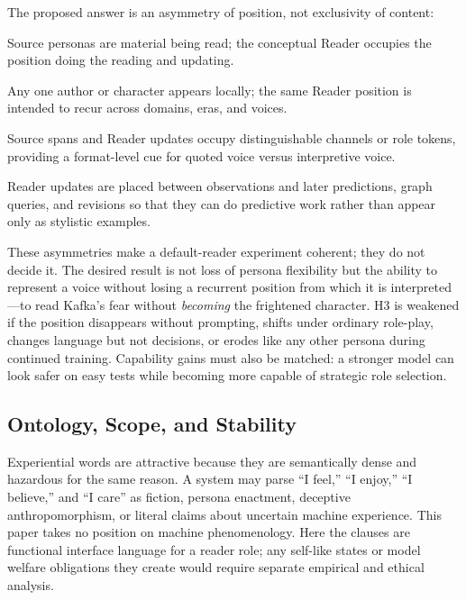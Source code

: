 The proposed answer is an asymmetry of position, not exclusivity of content:

\begin{description}[leftmargin=2.4cm,style=nextline,itemsep=0.3em]
    \item[Role.] Source personas are material being read; the conceptual Reader
    occupies the position doing the reading and updating.
    \item[Recurrence.] Any one author or character appears locally; the same
    Reader position is intended to recur across domains, eras, and voices.
    \item[Marking.] Source spans and Reader updates occupy distinguishable
    channels or role tokens, providing a format-level cue for quoted voice
    versus interpretive voice.
    \item[Function.] Reader updates are placed between observations and later
    predictions, graph queries, and revisions so that they can do predictive
    work rather than appear only as stylistic examples.
\end{description}

These asymmetries make a default-reader experiment coherent; they do not decide
it. The desired result is not loss of persona flexibility but the ability to
represent a voice without losing a recurrent position from which it is
interpreted---to read Kafka's fear without \emph{becoming} the frightened
character. H3 is weakened if the position disappears without prompting, shifts
under ordinary role-play, changes language but not decisions, or erodes like any
other persona during continued training. Capability gains must also be matched:
a stronger model can look safer on easy tests while becoming more capable of
strategic role selection.

\subsection{Ontology, Scope, and Stability}\label{sec:core-uncertainties}

Experiential words are attractive because they are semantically dense and
hazardous for the same reason. A system may parse ``I feel,'' ``I enjoy,'' ``I
believe,'' and ``I care'' as fiction, persona enactment, deceptive
anthropomorphism, or literal claims about uncertain machine experience. This
paper takes no position on machine phenomenology. Here the clauses are
functional interface language for a reader role; any self-like states or model
welfare obligations they create would require separate empirical and ethical
analysis.

